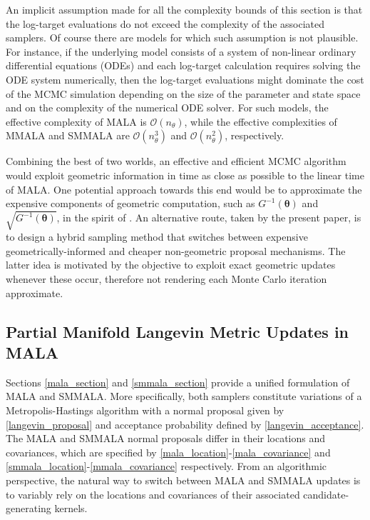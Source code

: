 \documentclass[twoside,11pt]{article}
\begin{document}
An implicit assumption made for all the complexity bounds of this section is that the log-target evaluations do not
exceed the complexity of the associated samplers. Of course there are models for which such assumption is not plausible.
For instance, if the underlying model consists of a system of non-linear ordinary differential equations (ODEs) and each 
log-target calculation requires solving the ODE system numerically, then the log-target evaluations might dominate the
cost of the MCMC simulation depending on the size of the parameter and state space and on the complexity of the numerical 
ODE solver.  
For such models, the effective complexity of MALA is $\mathcal{O}(n_{\theta})$, while the effective complexities of MMALA and SMMALA are $\mathcal{O}(n_{\theta}^3)$ and $\mathcal{O}(n_{\theta}^2)$, respectively.  

Combining the best of two worlds, an effective and efficient MCMC algorithm would exploit geometric information in time as 
close as possible to the linear time of MALA. One potential approach towards this end would be to approximate the expensive 
components of geometric computation, such as $G^{-1}(\boldsymbol{\theta})$ and $\sqrt{G^{-1}(\boldsymbol{\theta})}$, in the 
spirit of \cite{sim_bad_cem__sto}. An alternative route, taken by the present paper, is to design a hybrid sampling method 
that switches between expensive geometrically-informed and cheaper non-geometric proposal mechanisms. The latter idea is
motivated by the objective to exploit exact geometric updates whenever these occur, therefore not rendering each Monte Carlo 
iteration approximate.

\subsection{Partial Manifold Langevin Metric Updates in MALA}

Sections \ref{mala_section} and \ref{smmala_section} provide a unified formulation of MALA and SMMALA. More specifically, 
both samplers constitute variations of a Metropolis-Hastings algorithm with a normal proposal given by 
\eqref{langevin_proposal} and acceptance probability defined by \eqref{langevin_acceptance}. The MALA and SMMALA normal 
proposals differ in their locations and covariances, which are specified by \eqref{mala_location}-\eqref{mala_covariance} 
and \eqref{smmala_location}-\eqref{mmala_covariance} respectively. From an algorithmic perspective, the natural way to 
switch between MALA and SMMALA updates is to variably rely on the locations and covariances of their associated 
candidate-generating kernels.
\end{document}
